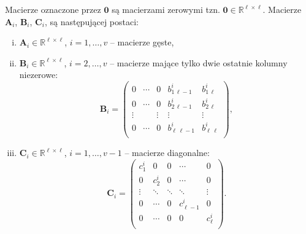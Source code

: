 \documentclass[]{article}
\newcommand{\mA}{\bm{A}}
\newcommand{\mB}{\bm{B}}
\newcommand{\mC}{\bm{C}}
\newcommand{\mZ}{\bm{0}}
\newcommand{\R}{\mathbb{R}}
\begin{document}
	\noindent Macierze oznaczone przez $\mZ$ są macierzami zerowymi tzn. $\mZ \in \R^{\ell\times \ell}$. Macierze $\mA_i$, $\mB_i$, $\mC_i$, są następującej postaci:
	\begin{enumerate}[(i)]
		\item $\mA_i \in \R^{\ell\times \ell}$,   $i = 1, \ldots,v$ -- macierze gęste,
		\item $\mB_i \in \R^{\ell\times \ell}$,   $i = 2, \ldots,v$ -- macierze mające tylko dwie ostatnie kolumny niezerowe:
		$$
		\mB_i =
		\left(\begin{array}{ccccc}
		0 & \cdots & 0 & b_{1\,\ell-1}^i & b_{1\,\ell}^i \\
		0 & \cdots & 0 & b_{2\,\ell-1}^i & b_{2\,\ell}^i \\
		\vdots & & \vdots & \vdots & \vdots \\
		0 & \cdots & 0 & b_{\ell\,\ell-1}^i & b_{\ell\,\ell}^i \\
		\end{array}\right),
		$$
		\item $\mC_i \in \R^{\ell\times \ell}$,   $i = 1, \ldots,v\!-\!1$ -- macierze diagonalne:
		$$
		\mC_i =
		\left(\begin{array}{ccccc}
		c_{1}^i & 0 & 0 & \cdots & 0  \\
		0 &  c_{2}^i &  0 & \cdots & 0  \\
		\vdots &  \ddots &  \ddots & \ddots & \vdots  \\
		0 & \cdots & 0 &  c_{\ell-1}^i & 0 \\
		0 & \cdots & 0 &  0 & c_{\ell}^i \\
		\end{array}\right).
		$$
	\end{enumerate}
\end{document}
